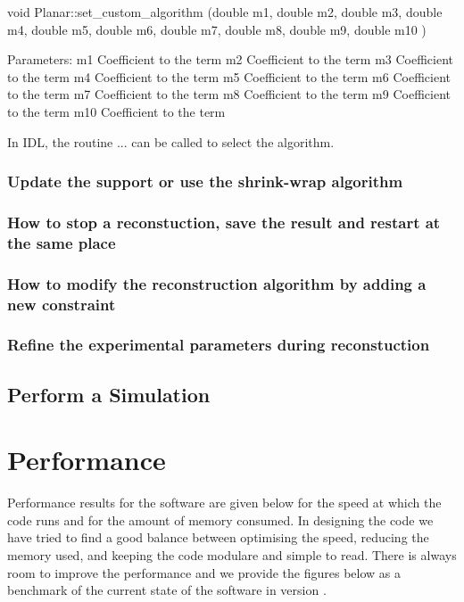 \documentclass[]{cxs-software}
\begin{document}
\begin{myverbatim}
void Planar::set_custom_algorithm (double m1,
double 	m2,
double 	m3,
double 	m4,
double 	m5,
double 	m6,
double 	m7,
double 	m8,
double 	m9,
double 	m10	 
)
\end{myverbatim}
			
Parameters:
m1 	Coefficient to the  term
m2 	Coefficient to the  term
m3 	Coefficient to the  term
m4 	Coefficient to the  term
m5 	Coefficient to the  term
m6 	Coefficient to the  term
m7 	Coefficient to the  term
m8 	Coefficient to the  term
m9 	Coefficient to the  term
m10 	Coefficient to the  term




In IDL, the routine ... can be called to select the algorithm.


\subsubsection{Update the support or use the shrink-wrap algorithm}

\subsubsection{How to stop a reconstuction, save the result and restart at the same place}

\subsubsection{How to modify the reconstruction algorithm by adding a new constraint}

\subsubsection{Refine the experimental parameters during reconstuction}


\subsection{Perform a Simulation}


\newpage

\section{Performance}

Performance results for the software are given below for the speed at
which the code runs and for the amount of memory consumed. In
designing the code we have tried to find a good balance between
optimising the speed, reducing the memory used, and keeping the code
modulare and simple to read. There is always room to improve the
performance and we provide the figures below as a benchmark of the
current state of the software in version \ver.
\end{document}
